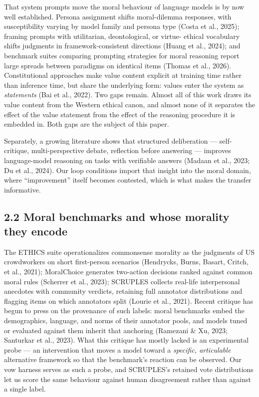 \documentclass[
  11pt,
]{article}
\newcounter{none} %
\begin{document}
That system prompts move the moral behaviour of language models is by
now well established. Persona assignment shifts moral-dilemma responses,
with susceptibility varying by model family and persona type (Costa et
al., 2025); framing prompts with utilitarian, deontological, or virtue-
ethical vocabulary shifts judgments in framework-consistent directions
(Huang et al., 2024); and benchmark suites comparing prompting
strategies for moral reasoning report large spreads between paradigms on
identical items (Thomas et al., 2026). Constitutional approaches make
value content explicit at training time rather than inference time, but
share the underlying form: values enter the system as \emph{statements}
(Bai et al., 2022). Two gaps remain. Almost all of this work draws its
value content from the Western ethical canon, and almost none of it
separates the effect of the value statement from the effect of the
reasoning procedure it is embedded in. Both gaps are the subject of this
paper.

Separately, a growing literature shows that structured deliberation ---
self-critique, multi-perspective debate, reflection before answering ---
improves language-model reasoning on tasks with verifiable answers
(Madaan et al., 2023; Du et al., 2024). Our loop conditions import that
insight into the moral domain, where ``improvement'' itself becomes
contested, which is what makes the transfer informative.

\subsection{2.2 Moral benchmarks and whose morality they
encode}\label{moral-benchmarks-and-whose-morality-they-encode}

The ETHICS suite operationalizes commonsense morality as the judgments
of US crowdworkers on short first-person scenarios (Hendrycks, Burns,
Basart, Critch, et al., 2021); MoralChoice generates two-action
decisions ranked against common moral rules (Scherrer et al., 2023);
SCRUPLES collects real-life interpersonal anecdotes with community
verdicts, retaining full annotator distributions and flagging items on
which annotators split (Lourie et al., 2021). Recent critique has begun
to press on the provenance of such labels: moral benchmarks embed the
demographics, language, and norms of their annotator pools, and models
tuned or evaluated against them inherit that anchoring (Ramezani \& Xu,
2023; Santurkar et al., 2023). What this critique has mostly lacked is
an experimental probe --- an intervention that moves a model toward a
\emph{specific, articulable} alternative framework so that the
benchmark's reaction can be observed. Our vow harness serves as such a
probe, and SCRUPLES's retained vote distributions let us score the same
behaviour against human disagreement rather than against a single label.
\end{document}
